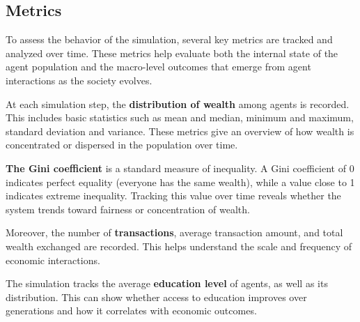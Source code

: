 \documentclass[english]{projectreport}
\begin{document}
\subsection{Metrics}

To assess the behavior of the simulation, several key metrics are tracked and analyzed over time. These metrics help evaluate both the internal state of the agent population and the macro-level outcomes that emerge from agent interactions as the society evolves.

At each simulation step, the \textbf{distribution of wealth} among agents is recorded. This includes basic statistics such as mean and median, minimum and maximum, standard deviation and variance. These metrics give an overview of how wealth is concentrated or dispersed in the population over time.

\textbf{The Gini coefficient} is a standard measure of inequality. A Gini coefficient of 0 indicates perfect equality (everyone has the same wealth), while a value close to 1 indicates extreme inequality. Tracking this value over time reveals whether the system trends toward fairness or concentration of wealth.

Moreover, the number of \textbf{transactions}, average transaction amount, and total wealth exchanged are recorded. This helps understand the scale and frequency of economic interactions.

The simulation tracks the average \textbf{education level} of agents, as well as its distribution. This can show whether access to education improves over generations and how it correlates with economic outcomes.






\end{document}
